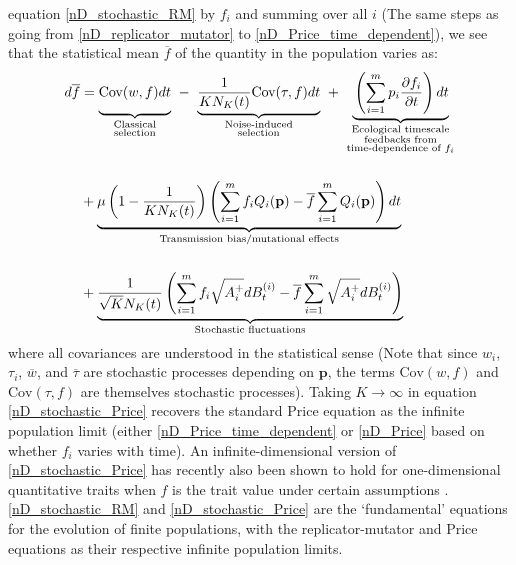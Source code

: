 equation \eqref{nD_stochastic_RM} by $f_i$ and summing over all $i$ (The same steps as going from \eqref{nD_replicator_mutator} to \eqref{nD_Price_time_dependent}), we see that the statistical mean $\overline{f}$ of the quantity in the population varies as:
\begin{equation}
\label{nD_stochastic_Price}
\begin{aligned}
d\overline{f} &= {\underbrace{\vphantom{ \frac{1}{KN_K(t)} }\textrm{Cov}(w,f)dt}_{\substack{\text{Classical} \\ \text{selection}}}} \ - \ {\underbrace{\frac{1}{KN_K(t)}\textrm{Cov}(\tau,f)dt}_{\substack{\text{Noise-induced} \\ \text{selection}}}} \ +  \  {\underbrace{\vphantom{ \frac{1}{KN_K(t)} }\left(\sum\limits_{i=1}^{m}p_i\frac{\partial f_i}{\partial t}\right)dt}_{\substack{\text{Ecological timescale} \\ \text{feedbacks from} \\ \text{time-dependence of $f_i$}}}}\\[15pt]
&+ \underbrace{\mu\left(1-\frac{1}{KN_K(t)}\right)\left(\sum\limits_{i=1}^{m}f_iQ_i(\mathbf{p}) - \overline{f}\sum\limits_{i=1}^{m}Q_i(\mathbf{p})\right)dt}_{\text{Transmission bias/mutational effects}}\\[15pt]
&+ \underbrace{\frac{1}{\sqrt{K}N_{K}(t)}\left(\sum\limits_{i=1}^{m}f_i\sqrt{A_i^+}dB_{t}^{(i)} - \overline{f}\sum\limits_{i=1}^{m}\sqrt{A_i^+}dB_{t}^{(i)}\right)}_{\text{Stochastic fluctuations}}
\end{aligned} 
\end{equation}
where all covariances are understood in the statistical sense (Note that since $w_i$, $\tau_i$, $\overline{w}$, and $\overline{\tau}$ are stochastic processes depending on $\mathbf{p}$, the terms $\textrm{Cov}(w,f)$ and $\textrm{Cov}(\tau,f)$ are themselves stochastic processes). Taking $K \to \infty$ in equation \eqref{nD_stochastic_Price} recovers the standard Price equation as the infinite population limit (either \eqref{nD_Price_time_dependent} or \eqref{nD_Price} based on whether $f_i$ varies with time).  An infinite-dimensional version of \eqref{nD_stochastic_Price} has recently also been shown to hold for one-dimensional quantitative traits when $f$ is the trait value under certain assumptions \citep{week_white_2021}. \eqref{nD_stochastic_RM} and \eqref{nD_stochastic_Price} are the `fundamental' equations for the evolution of finite populations, with the replicator-mutator and Price equations as their respective infinite population limits.\\
